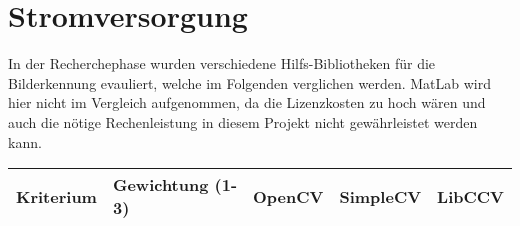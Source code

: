 \section{Stromversorgung}

In der Recherchephase wurden verschiedene Hilfs-Bibliotheken für die Bilderkennung evauliert, welche im Folgenden verglichen werden.
MatLab wird hier nicht im Vergleich aufgenommen, da die Lizenzkosten zu hoch wären und auch die nötige Rechenleistung in diesem Projekt nicht gewährleistet werden kann.

\begin{table}[h]
\begin{tabular}{|p{4.5cm}|p{3.5cm}|p{2cm}|p{2cm}|p{2cm}|}\hline
	
	\textbf{Kriterium}	& 	\textbf{Gewichtung (1-3)} & \textbf{OpenCV} & \textbf{SimpleCV} & \textbf{LibCCV}\\\hline
	
	
	
\end{tabular}\\
\end{table}